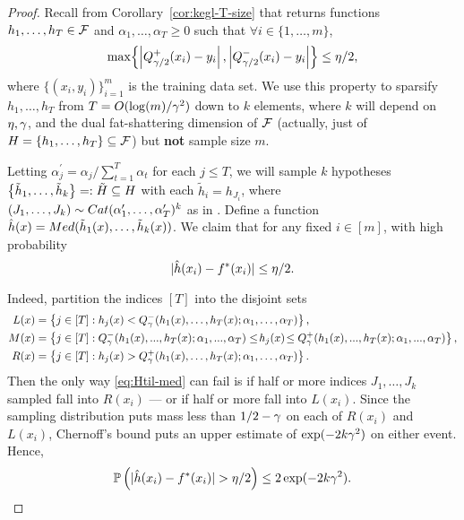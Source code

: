 \documentclass[12pt,a4paper,oneside,onecolumn]{book}
\begin{document}
\begin{proof}

Recall from Corollary~\ref{cor:kegl-T-size} that 
 returns functions $h_{1},\ldots,h_{T} \in \mathcal{F}$ and $\alpha_{1},\ldots,\alpha_{T} \geq 0$ 
such that $\forall i \in \{1,\ldots,m\}$, 
\begin{equation*}
\max\!\left\{ \left| Q_{\gamma/2}^{+}(x_{i}) - y_{i} \right|, \left| Q_{\gamma/2}^{-}(x_{i}) - y_{i} \right| \right\} \leq \eta/2,
\end{equation*}
where $\{(x_{i},y_{i})\}_{i=1}^{m}$ is the training data set.
We use this %
property to sparsify $h_{1},\ldots,h_{T}$ from $T=O(\log(m)/\gamma^2)$
down to $k$
elements, where $k$ will depend on $\eta,\gamma$, and
the dual fat-shattering
dimension of $\mathcal{F}$
(actually, just of $H = \{h_{1},\ldots,h_{T}\}\subseteq\mathcal{F}$)
but {\bf not} sample size $m$.

Letting $\alpha_{j}^{\prime} = \alpha_{j} / \sum_{t=1}^{T} \alpha_{t}$ for each $j \leq T$, 
we will sample $k$ hypotheses $\left\{ \tilde h_1,\ldots,\tilde h_k \right\}=:\tilde H\subseteq H$ 
with each $\tilde{h}_{i} = h_{J_{i}}$, where
$(J_{1},\ldots,J_{k}) \sim Cat(\alpha_{1}^{\prime},\ldots,\alpha_{T}^{\prime})^{k}$
as in .
Define a function $\hat{h}(x) = Med(\tilde{h}_{1}(x),\ldots,\tilde{h}_{k}(x))$.
We claim that for any fixed $i\in[m]$,
with high probability
\begin{equation}
  \label{eq:Htil-med}
|\hat{h}(x_i)-f^*(x_i)|\le\eta/2.
\end{equation}
\begin{sloppypar}
Indeed,
partition the indices $[T]$ into the disjoint sets
\small{
\begin{align*}
L(x) &= \left\{  j \in[ T] : h_{j}(x) < Q_{\gamma}^{-}(h_{1}(x),\ldots,h_{T}(x);\alpha_{1},\ldots,\alpha_{T})  \right\},\\
M(x) &= \left\{  j \in[ T] : Q_{\gamma}^{-}(h_{1}(x),...,h_{T}(x);\alpha_{1},...,\alpha_{T}) \leq\! h_{j}(x) \!\leq Q_{\gamma}^{+}(h_{1}(x),...,h_{T}(x);\alpha_{1},...,\alpha_{T})  \right\},\\
R(x) &= \left\{  j \in[ T] : h_{j}(x) > Q_{\gamma}^{+}(h_{1}(x),\ldots,h_{T}(x);\alpha_{1},\ldots,\alpha_{T})  \right\}.
\end{align*}
}
Then 
the only way
\eqref{eq:Htil-med}
can fail is if half or more indices
$J_{1},\ldots,J_{k}$ sampled fall into $R(x_i)$ --- or if half or more fall into $L(x_i)$.
Since the sampling distribution puts mass less than $1/2-\gamma$ 
on each of $R(x_i)$ and $L(x_i)$, 
Chernoff's bound puts an upper estimate of
$\exp(-2k\gamma^2)$ on either event.
Hence,
\begin{equation}
  \label{eq:Htil-med-prob}
  \mathbb{P}\paren{|\hat{h}(x_i)-f^*(x_i)|>\dev/2}
  \le2\exp(-2k\adv^2).
\end{equation}
\end{sloppypar}


\end{proof}
\end{document}
